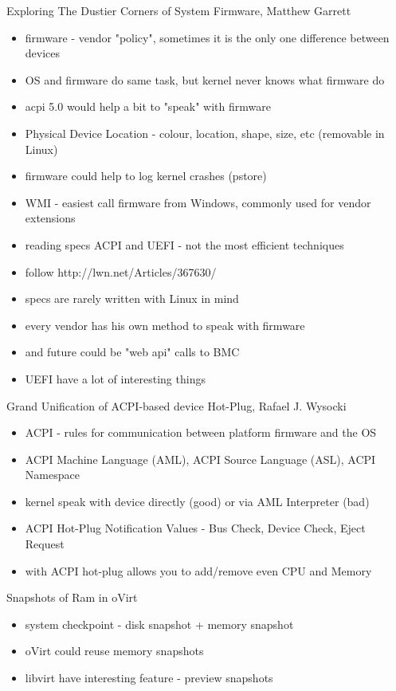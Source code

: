 \documentclass[aspectratio=169]{beamer}
\begin{document}
\begin{frame}{Exploring The Dustier Corners of System Firmware, Matthew Garrett}
  \begin{itemize}
  \item firmware - vendor "policy", sometimes it is the only one difference between devices
  \item OS and firmware do same task, but kernel never knows what firmware do
  \item acpi 5.0 would help a bit to "speak" with firmware
  \item Physical Device Location - colour, location, shape, size, etc (removable in Linux)
  \item firmware could help to log kernel crashes (pstore)
  \item WMI - easiest call firmware from Windows, commonly used for vendor extensions
  \item reading specs ACPI and UEFI - not the most efficient techniques
  \item follow http://lwn.net/Articles/367630/
  \item specs are rarely written with Linux in mind
  \item every vendor has his own method to speak with firmware
  \item and future could be "web api" calls to BMC
  \item UEFI have a lot of interesting things
  \end{itemize}
\end{frame}

\begin{frame}{Grand Unification of ACPI-based device Hot-Plug, Rafael J. Wysocki}
  \begin{itemize}
  \item ACPI - rules for communication between platform firmware and the OS
  \item ACPI Machine Language (AML), ACPI Source Language (ASL), ACPI Namespace
  \item kernel speak with device directly (good) or via AML Interpreter (bad)
  \item ACPI Hot-Plug Notification Values - Bus Check, Device Check, Eject Request
  \item with ACPI hot-plug allows you to add/remove even CPU and Memory
  \end{itemize}
\end{frame}

\begin{frame}{Snapshots of Ram in oVirt}
  \begin{itemize}
  \item system checkpoint - disk snapshot + memory snapshot
  \item oVirt could reuse memory snapshots
  \item libvirt have interesting feature - preview snapshots
  \end{itemize}
\end{frame}
\end{document}
